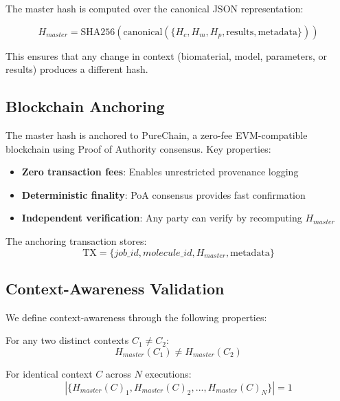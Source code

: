 The master hash is computed over the canonical JSON representation:

\begin{equation}
    H_{master} = \text{SHA256}(\text{canonical}(\{H_c, H_m, H_p, \text{results}, \text{metadata}\}))
\end{equation}

This ensures that any change in context (biomaterial, model, parameters, or results) produces a different hash.

\subsection{Blockchain Anchoring}

The master hash is anchored to PureChain, a zero-fee EVM-compatible blockchain using Proof of Authority consensus. Key properties:

\begin{itemize}
    \item \textbf{Zero transaction fees}: Enables unrestricted provenance logging
    \item \textbf{Deterministic finality}: PoA consensus provides fast confirmation
    \item \textbf{Independent verification}: Any party can verify by recomputing $H_{master}$
\end{itemize}

The anchoring transaction stores:
\begin{equation}
    \text{TX} = \{job\_id, molecule\_id, H_{master}, \text{metadata}\}
\end{equation}

\subsection{Context-Awareness Validation}

We define context-awareness through the following properties:

\begin{property}
For any two distinct contexts $C_1 \neq C_2$:
\begin{equation}
    H_{master}(C_1) \neq H_{master}(C_2)
\end{equation}
\end{property}

\begin{property}
For identical context $C$ across $N$ executions:
\begin{equation}
    |\{H_{master}(C)_1, H_{master}(C)_2, ..., H_{master}(C)_N\}| = 1
\end{equation}
\end{property}

